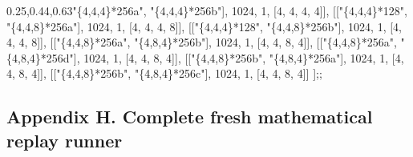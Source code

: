 \documentclass[
  10pt,
  letterpaper,
]{article}
\newenvironment{Shaded}{}{}
\newcommand{\FloatTok}[1]{\textcolor[rgb]{0.25,0.63,0.44}{#1}}
\newcommand{\NormalTok}[1]{#1}
\newcommand{\OperatorTok}[1]{\textcolor[rgb]{0.40,0.40,0.40}{#1}}
\newcommand{\StringTok}[1]{\textcolor[rgb]{0.25,0.44,0.63}{#1}}
\begin{document}
\begin{Shaded}
\begin{Highlighting}[]
\NormalTok{[[}\StringTok{"\{4,4,4\}*256a"}\OperatorTok{,} \StringTok{"\{4,4,4\}*256b"}\NormalTok{]}\OperatorTok{,} \FloatTok{1024}\OperatorTok{,} \FloatTok{1}\OperatorTok{,}\NormalTok{ [}\FloatTok{4}\OperatorTok{,} \FloatTok{4}\OperatorTok{,} \FloatTok{4}\OperatorTok{,} \FloatTok{4}\NormalTok{]]}\OperatorTok{,}
\NormalTok{[[}\StringTok{"\{4,4,4\}*128"}\OperatorTok{,} \StringTok{"\{4,4,8\}*256a"}\NormalTok{]}\OperatorTok{,} \FloatTok{1024}\OperatorTok{,} \FloatTok{1}\OperatorTok{,}\NormalTok{ [}\FloatTok{4}\OperatorTok{,} \FloatTok{4}\OperatorTok{,} \FloatTok{4}\OperatorTok{,} \FloatTok{8}\NormalTok{]]}\OperatorTok{,}
\NormalTok{[[}\StringTok{"\{4,4,4\}*128"}\OperatorTok{,} \StringTok{"\{4,4,8\}*256b"}\NormalTok{]}\OperatorTok{,} \FloatTok{1024}\OperatorTok{,} \FloatTok{1}\OperatorTok{,}\NormalTok{ [}\FloatTok{4}\OperatorTok{,} \FloatTok{4}\OperatorTok{,} \FloatTok{4}\OperatorTok{,} \FloatTok{8}\NormalTok{]]}\OperatorTok{,}
\NormalTok{[[}\StringTok{"\{4,4,8\}*256a"}\OperatorTok{,} \StringTok{"\{4,8,4\}*256b"}\NormalTok{]}\OperatorTok{,} \FloatTok{1024}\OperatorTok{,} \FloatTok{1}\OperatorTok{,}\NormalTok{ [}\FloatTok{4}\OperatorTok{,} \FloatTok{4}\OperatorTok{,} \FloatTok{8}\OperatorTok{,} \FloatTok{4}\NormalTok{]]}\OperatorTok{,}
\NormalTok{[[}\StringTok{"\{4,4,8\}*256a"}\OperatorTok{,} \StringTok{"\{4,8,4\}*256d"}\NormalTok{]}\OperatorTok{,} \FloatTok{1024}\OperatorTok{,} \FloatTok{1}\OperatorTok{,}\NormalTok{ [}\FloatTok{4}\OperatorTok{,} \FloatTok{4}\OperatorTok{,} \FloatTok{8}\OperatorTok{,} \FloatTok{4}\NormalTok{]]}\OperatorTok{,}
\NormalTok{[[}\StringTok{"\{4,4,8\}*256b"}\OperatorTok{,} \StringTok{"\{4,8,4\}*256a"}\NormalTok{]}\OperatorTok{,} \FloatTok{1024}\OperatorTok{,} \FloatTok{1}\OperatorTok{,}\NormalTok{ [}\FloatTok{4}\OperatorTok{,} \FloatTok{4}\OperatorTok{,} \FloatTok{8}\OperatorTok{,} \FloatTok{4}\NormalTok{]]}\OperatorTok{,}
\NormalTok{[[}\StringTok{"\{4,4,8\}*256b"}\OperatorTok{,} \StringTok{"\{4,8,4\}*256c"}\NormalTok{]}\OperatorTok{,} \FloatTok{1024}\OperatorTok{,} \FloatTok{1}\OperatorTok{,}\NormalTok{ [}\FloatTok{4}\OperatorTok{,} \FloatTok{4}\OperatorTok{,} \FloatTok{8}\OperatorTok{,} \FloatTok{4}\NormalTok{]]}
\NormalTok{]}\OperatorTok{;;}
\end{Highlighting}
\end{Shaded}

\subsection{Appendix H. Complete fresh mathematical replay
runner}\label{appendix-h.-complete-fresh-mathematical-replay-runner}
\end{document}

